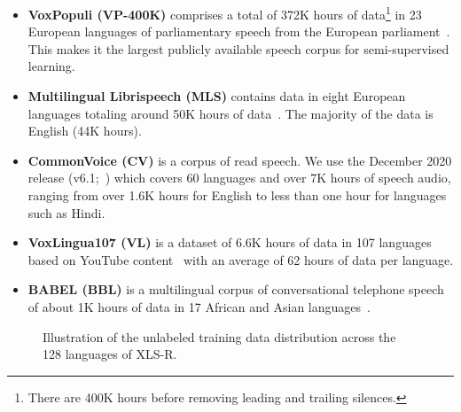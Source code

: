 \documentclass{article} \usepackage{iclr2022_conference,times}
\newcommand{\xlsrp}{XLS-R}
\begin{document}
\begin{itemize}
    \item \textbf{VoxPopuli (VP-400K)} comprises a total of 372K hours of data\footnote{There are 400K hours before removing leading and trailing silences.} in 23 European languages of parliamentary speech from the European parliament~\citep{wang2021voxpopuli}. This makes it the largest publicly available speech corpus for semi-supervised learning. 
    \item \textbf{Multilingual Librispeech (MLS)} contains data in eight European languages totaling around 50K hours of data~\citep{pratap2020mls}. The majority of the data is English (44K hours).
    \item \textbf{CommonVoice (CV)} is a corpus of read speech. We use the December 2020 release (v6.1;~\citealt{ardila2019common}) which covers 60 languages and over 7K hours of speech audio, ranging from over 1.6K hours for English to less than one hour for languages such as Hindi.
    \item \textbf{VoxLingua107 (VL)} is a dataset of 6.6K hours of data in 107 languages based on YouTube content~\citep{valk2020voxlingua107} with an average of 62 hours of data per language.
    \item \textbf{BABEL (BBL)} is a multilingual corpus of conversational telephone speech of about 1K hours of data in 17 African and Asian languages~\citep{gales2014babel}. 
\end{itemize}

\begin{figure}[t]
\caption{Illustration of the unlabeled training data distribution across the 128 languages of \xlsrp{}.}
\label{fig:langstats}
\end{figure}
\end{document}
